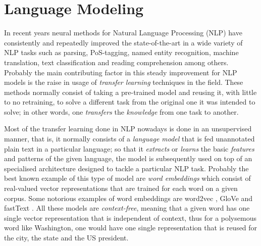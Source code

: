 \section{Language Modeling}

In recent years neural methods for Natural Language Processing (NLP) have consistently and repeatedly improved the state-of-the-art in a wide variety of NLP tasks such as parsing, PoS-tagging, named entity recognition, machine translation, text classification and reading comprehension among others. Probably the main contributing factor in this steady improvement for NLP models is the raise in usage of \emph{transfer learning} techniques in the field. These methods normally consist of taking a pre-trained model and reusing it, with little to no retraining, to solve a different task from the original one it was intended to solve; in other words, one \emph{transfers} the \emph{knowledge} from one task to another.

Most of the transfer learning done in NLP nowadays is done in an unsupervised manner, that is, it normally consists of a  \emph{language model} that is fed unannotated plain text in a particular language; so that it \emph{extracts} or \emph{learns} the basic \emph{features} and patterns of the given language, the model is subsequently used on top of an specialised architecture designed to tackle a particular NLP task. Probably the best known example of this type of model are \emph{word embeddings} which consist of real-valued vector representations that are trained for each word on a given corpus. Some notorious examples of word embeddings are word2vec \citep{mikolov-etal-2013-distributed}, GloVe \citep{pennington-etal-2014-glove} and \mbox{fastText} \citep{mikolov-etal-2018-advances}. All these models are \emph{context-free}, meaning that a given word has one single vector representation that is independent of context, thus for a polysemous word like Washington, one would have one single representation that is reused for the city, the state and the US president.

